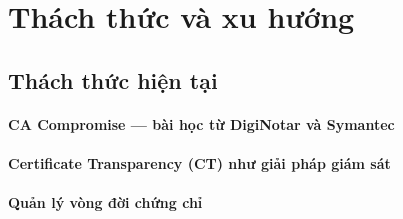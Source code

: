 \chapter{Thách thức và xu hướng}
\label{chap:challenges}


\section{Thách thức hiện tại}
\label{sec:7.1}

\subsubsection*{CA Compromise — bài học từ DigiNotar và Symantec}

\subsubsection*{Certificate Transparency (CT) như giải pháp giám sát}

\subsubsection*{Quản lý vòng đời chứng chỉ}

